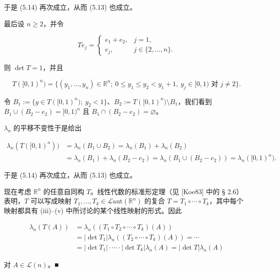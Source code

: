 \begin{theorem}
\begin{subitems}
于是 (5.14) 再次成立，从而 (5.13) 也成立。

\item

最后设 $ n \ge 2 $，并令

\begin{equation*}
Te_j = \begin{cases} e_1 + e_2 , & j = 1 , \\ e_j , & j \in \{2, \ldots, n\} . \end{cases}
\end{equation*}

则 $ \det T = 1 $，并且

\[
T([0, 1)^n) = \{ (y_1, \ldots, y_n) \in \mathbb{R}^n ;\ 0 \le y_1 \le y_2 < y_1 + 1, \ y_j \in [0, 1) \text{ 对 } j \ne 2 \} .
\]

令 $ B_1 := \{ y \in T([0, 1)^n) ;\ y_2 < 1 \} $、$ B_2 := T([0, 1)^n) \setminus B_1 $，我们看到 $ B_1 \cup (B_2 - e_2) = [0, 1)^n $ 且 $ B_1 \cap (B_2 - e_2) = \varnothing $。

\end{subitems}


$ \lambda_n $ 的平移不变性于是给出

\begin{equation*}
\begin{aligned}
\lambda_n(T([0, 1)^n)) &= \lambda_n(B_1 \cup B_2) = \lambda_n(B_1) + \lambda_n(B_2) \\ &= \lambda_n(B_1) + \lambda_n(B_2 - e_2) = \lambda_n(B_1 \cup (B_2 - e_2)) = \lambda_n([0, 1)^n) .
\end{aligned}
\end{equation*}

于是 (5.14) 再次成立，从而 (5.13) 也成立。

\begin{subitems}
\item[（vi）]

现在考虑 $ \mathbb{R}^n $ 的任意自同构 $ T $。线性代数的标准形定理（见 [Koe83] 中的 § 2.6）表明，$ T $ 可以写成映射 $ T_1, \ldots, T_k \in \mathcal{L}\mathrm{aut}(\mathbb{R}^n) $ 的复合 $ T = T_1 \circ \cdots \circ T_k $，其中每个映射都具有 (iii)–(v) 中所讨论的某个线性映射的形式。因此

\begin{equation*}
\begin{aligned}
\lambda_n(T(A)) &= \lambda_n((T_1 \circ T_2 \circ \cdots \circ T_k)(A)) \\ &= |\det T_1| \lambda_n((T_2 \circ \cdots \circ T_k)(A)) = \cdots \\ &= |\det T_1| \cdot \cdots \cdot |\det T_k| \lambda_n(A) = |\det T| \lambda_n(A)
\end{aligned}
\end{equation*}

对 $ A \in \mathcal{L}(n) $。\nobreak\hspace{0.35em}■

\end{subitems}

\end{theorem}


